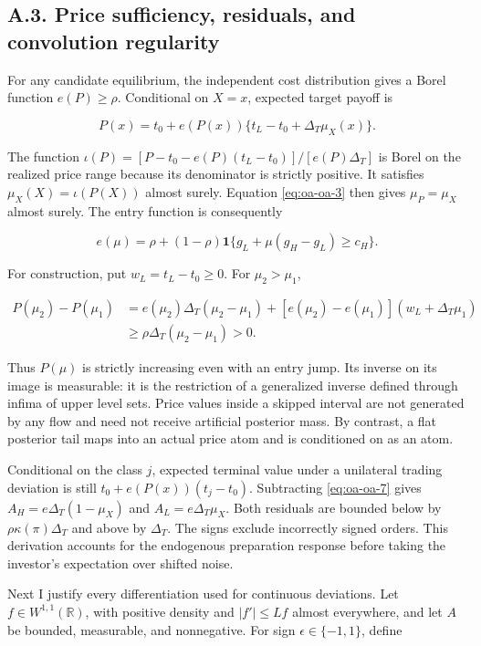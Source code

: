 \documentclass[
  11pt,
]{article}
\begin{document}
\subsection{A.3. Price sufficiency, residuals, and convolution
regularity}\label{oa-a-inference}

For any candidate equilibrium, the
independent cost distribution gives a Borel function \(e(P)\ge\rho\).
Conditional on \(X=x\), expected target payoff is

\[
P(x)=t_0+e(P(x))\{t_L-t_0+\Delta_T\mu_X(x)\}.
\tag{OA.7}\label{eq:oa-oa-7}
\]

The function \(\iota(P)=[P-t_0-e(P)(t_L-t_0)]/[e(P)\Delta_T]\) is Borel on
the realized price range because its denominator is strictly positive.
It satisfies \(\mu_X(X)=\iota(P(X))\) almost surely. Equation
\eqref{eq:oa-oa-3} then gives \(\mu_P=\mu_X\) almost surely. The entry
function is consequently

\[
e(\mu)=\rho+(1-\rho)\mathbf1\{g_L+\mu(g_H-g_L)\ge c_H\}.
\tag{OA.8}\label{eq:oa-oa-8}
\]

For construction, put \(w_L=t_L-t_0\ge0\). For \(\mu_2>\mu_1\),

\[
\begin{aligned}
P(\mu_2)-P(\mu_1)
&=e(\mu_2)\Delta_T(\mu_2-\mu_1)
+[e(\mu_2)-e(\mu_1)](w_L+\Delta_T\mu_1)\\
&\ge\rho\Delta_T(\mu_2-\mu_1)>0.
\end{aligned}
\tag{OA.9}\label{eq:oa-oa-9}
\]

Thus \(P(\mu)\) is strictly increasing even with an entry jump. Its
inverse on its image is measurable: it is the restriction of a
generalized inverse defined through infima of upper level sets. Price
values inside a skipped interval are not generated by any flow and need
not receive artificial posterior mass. By contrast, a flat posterior
tail maps into an actual price atom and is conditioned on as an atom.

Conditional on the class \(j\), expected terminal value under a
unilateral trading deviation is still \(t_0+e(P(x))(t_j-t_0)\).
Subtracting \eqref{eq:oa-oa-7} gives \(A_H=e\Delta_T(1-\mu_X)\) and
\(A_L=e\Delta_T\mu_X\). Both residuals are bounded below by
\(\rho\kappa(\pi)\Delta_T\) and above by \(\Delta_T\). The signs exclude incorrectly signed
orders. This derivation accounts for the endogenous preparation response
before taking the investor's expectation over shifted noise.

Next I justify every differentiation used for continuous deviations. Let
\(f\in W^{1,1}(\mathbb R)\), with positive density and \(|f'|\le Lf\)
almost everywhere, and let \(A\) be bounded, measurable, and
nonnegative. For sign \(\epsilon\in\{-1,1\}\), define
\end{document}
